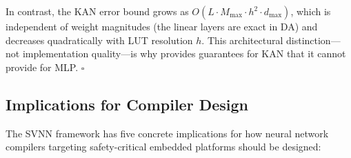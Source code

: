 In contrast, the KAN error bound grows as $O(L \cdot M_{\max} \cdot
h^2 \cdot d_{\max})$, which is independent of weight magnitudes (the linear layers
are exact in DA) and decreases quadratically with LUT resolution $h$.
This architectural distinction---not implementation quality---is why
\neuroplc provides guarantees for KAN that it cannot provide for MLP.
$\square$





\subsection{Implications for Compiler Design}
\label{sec:svnn-implications}

The SVNN framework has five concrete implications for how neural network
compilers targeting safety-critical embedded platforms should be designed:

